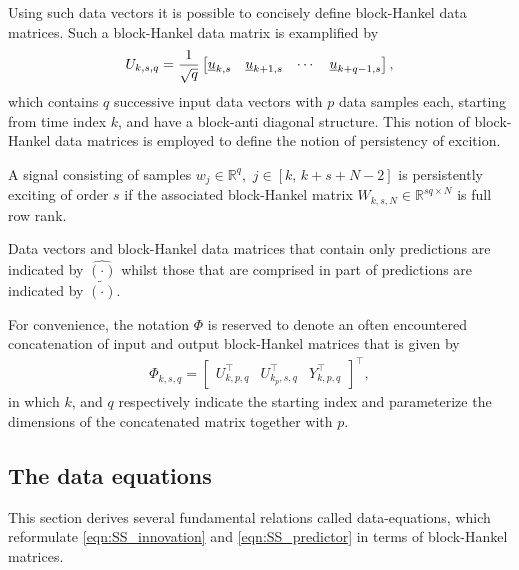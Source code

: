Using such data vectors it is possible to concisely define block-Hankel data matrices. Such a block-Hankel data matrix is examplified by
\begin{align*}
    U_{k,s,q} = \frac{1}{\sqrt{q}}\begin{bmatrix}
        \underline{u}_{k,s} & \underline{u}_{k+1,s} & \cdots & \underline{u}_{k+q-1,s}
    \end{bmatrix},
\end{align*}
which contains $q$ successive input data vectors with $p$ data samples each, starting from time index $k$, and have a block-anti diagonal structure. This notion of block-Hankel data matrices is employed to define the notion of persistency of excition.
\begin{defn}\label{def:PE}
    A signal consisting of samples ${w_j\in\mathbb{R}^q},$ $j\in[k,\,k+s+N-2]$ is persistently exciting of order $s$ if the associated block-Hankel matrix ${W_{k,s,N}\in\mathbb{R}^{sq \times N}}$ is full row rank.
\end{defn}
Data vectors and block-Hankel data matrices that contain only predictions are indicated by $\hat{(\cdot)}$ whilst those that are comprised in part of predictions are indicated by $\tilde{(\cdot)}$.

For convenience, the notation $\Phi$ is reserved to denote an often encountered concatenation of input and output block-Hankel matrices that is given by
\begin{align*}
    \Phi_{k,s,q} = \begin{bmatrix}
        U_{k,p,q}^\top & U_{k_p,s,q}^\top & Y_{k,p,q}^\top
    \end{bmatrix}^\top,
\end{align*}
in which $k$, and $q$ respectively indicate the starting index and parameterize the dimensions of the concatenated matrix together with $p$.
% 
\subsection{The data equations}\label{sec:DerivingDataEquations}
This section derives several fundamental relations called data-equations, which reformulate \eqref{eqn:SS_innovation} and \eqref{eqn:SS_predictor} in terms of block-Hankel matrices.

